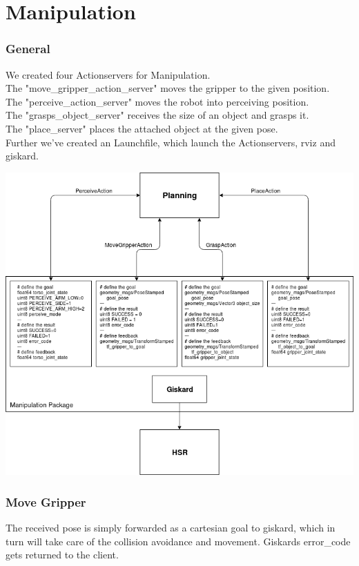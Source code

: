 \documentclass[main.tex]{subfiles}
\begin{document}
	
	\chapter{Manipulation}
	
	\subsection{General}
	We created four Actionservers for Manipulation.\\
	The "move\_gripper\_action\_server" moves the gripper to the given position.\\
	The "perceive\_action\_server" moves the robot into perceiving position.\\
	The "grasps\_object\_server" receives the size of an object and grasps it.\\
	The "place\_server" places the attached object at the given pose.\\
	Further we've created an Launchfile, which launch the Actionservers, rviz and giskard.
	
	\includegraphics[scale=0.5]{subdocuments/Manipulation.png}
	
	\subsection{Move Gripper}
	The received pose is simply forwarded as a cartesian goal to giskard, which in turn will take care of the collision avoidance and movement. Giskards error\_code gets returned to the client.
	\vspace{1cm}
	
\end{document}
